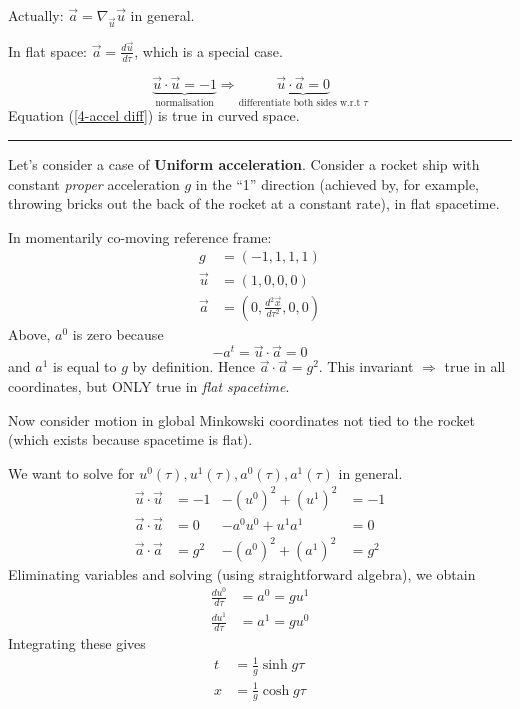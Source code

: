 \documentclass[a4paper]{article} %
\begin{document}
Actually: $\vec{a}=\nabla_{\vec{u}}\vec{u}$ in general.

In flat space: $\vec{a}=\frac{d\vec{u}}{d\tau}$, which is a special case.

\begin{equation}
\underbrace{\vec{u}\cdot\vec{u}=-1}_{\text{normalisation}}\Rightarrow \underbrace{\vec{u}\cdot\vec{a}=0}_{\text{differentiate both sides w.r.t $\tau$}}\label{4-accel diff}
\end{equation}
Equation (\ref{4-accel diff}) is true in curved space.

\hrule

Let's consider a case of \textbf{Uniform acceleration}. Consider a rocket ship with constant \emph{proper} acceleration $g$ in the ``1'' direction (achieved by, for example, throwing bricks out the back of the rocket at a constant rate), in flat spacetime.

In momentarily co-moving reference frame:
\begin{align*}
g&=(-1,1,1,1)\\
\vec{u}&=(1,0,0,0)\\
\vec{a}&=(0,\frac{d^2\vec{x}}{d\tau^2},0,0)
\end{align*}
Above, $a^0$ is zero because
\begin{equation}
-a^t=\vec{u}\cdot\vec{a}=0
\end{equation}
and $a^1$ is equal to $g$ by definition. Hence $\vec{a}\cdot\vec{a}=g^2$. This invariant $\Rightarrow$ true in all coordinates, but ONLY true in \emph{flat spacetime}.

Now consider motion in global Minkowski coordinates not tied to the rocket (which exists because spacetime is flat).

We want to solve for $u^0(\tau),u^1(\tau),a^0(\tau),a^1(\tau)$ in general.
\begin{align*}
\vec{u}\cdot\vec{u}&=-1&-(u^0)^2+(u^1)^2&=-1\\
\vec{a}\cdot\vec{u}&=0& -a^0 u^0+u^1 a^1&=0 \\
\vec{a}\cdot\vec{a}&=g^2& -(a^0)^2+(a^1)^2&=g^2
\end{align*}
Eliminating variables and solving (using straightforward algebra), we obtain 
\begin{align*}
\frac{du^0}{d\tau}&=a^0=gu^1\\
\frac{du^1}{d\tau}&=a^1=gu^0
\end{align*}
Integrating these gives
\begin{align*}
t&=\frac{1}{g}\sinh g\tau\\
x&=\frac{1}{g}\cosh g\tau
\end{align*}
\end{document}
